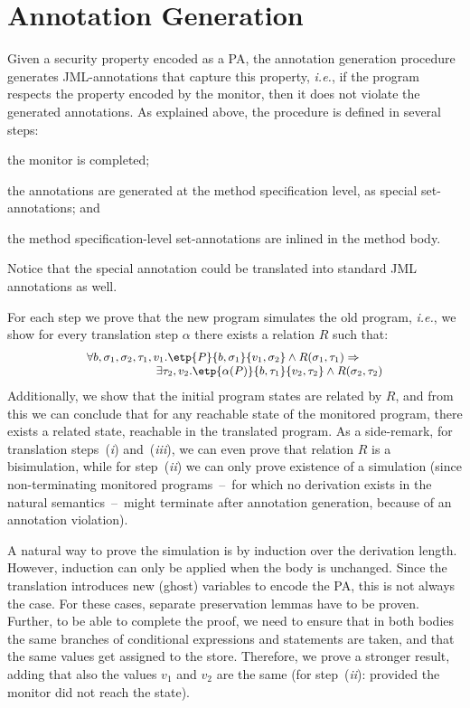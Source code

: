 \section{Annotation Generation}\label{SecAnnotGen}

Given a security property encoded as a PA, the annotation generation
procedure generates JML-annotations that capture this property,
\emph{i.e.}, if the program respects the property encoded by the
monitor, then it does not violate the generated annotations. As
explained above, the procedure is defined in several steps:
\begin{inparaenum}
\item the monitor is completed; %
\item the annotations are generated at the method specification level,
as special set-annotations; and
\item the method specification-level set-annotations are inlined in
the method body.
\end{inparaenum}
Notice that the special \CaseJML annotation could be translated into
standard JML annotations as well.

For each step we prove that the new program simulates the old program,
\emph{i.e.}, we show for every translation step
\(\alpha\) there exists a relation \(R\) such that:
\[{\small
\begin{array}{r}
\forall b, \sigma_1, \sigma_2, \tau_1, v_1.
\etp{P}{b,\sigma_1}{v_1, \sigma_2} \wedge
R(\sigma_1, \tau_1) \Rightarrow \qquad \\
\qquad
\exists \tau_2, v_2.
\etp{\alpha(P)}{b, \tau_1}{v_2, \tau_2} \wedge
R(\sigma_2, \tau_2)
\end{array}}
\]
Additionally, we show that the initial program states are related by
\(R\), and from this we can conclude that for any reachable state of
the monitored program, there exists a related state, reachable in the
translated program. As a side-remark, for translation steps~(\emph{i})
and~(\emph{iii}), we can even prove that relation \(R\) is a
bisimulation, while for step~(\emph{ii}) we can only prove existence
of a simulation (since non-terminating monitored programs~--~for which
no derivation exists in the natural semantics~--~might terminate after
annotation generation, because of an annotation violation).

A natural way to prove the simulation is by induction over the
derivation length.  However, induction can only be applied when the
body is unchanged. Since the translation introduces new (ghost)
variables to encode the PA, this is not always the case. For these
cases, separate preservation lemmas have to be proven.  Further, to be
able to complete the proof, we need to ensure that in both bodies the
same branches of conditional expressions and statements are taken, and
that the same values get assigned to the store. Therefore, we prove a
stronger result, adding that also the values %
\(v_1\) and \(v_2\) are the same (for step~(\emph{ii}): provided the
monitor did not reach the \halted state).


